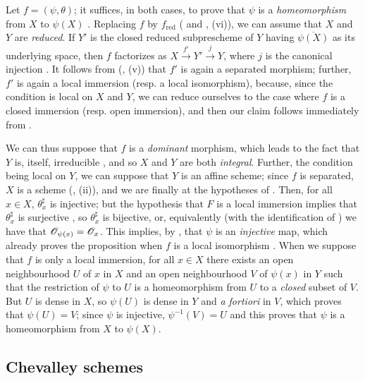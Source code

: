 Let $f=(\psi,\theta)$; it suffices, in both cases, to prove that $\psi$ is a
\emph{homeomorphism} from $X$ to $\psi(X)$ . Replacing $f$ by
$f_\mathrm{red}$ ( and , (vi)), we can assume that $X$
and $Y$ are \emph{reduced}. If $Y'$ is the closed reduced subprescheme of $Y$
having $\overline{\psi(X)}$ as its underlying space, then $f$ factorizes as
$X\xrightarrow{f'}Y'\xrightarrow{j}Y$, where $j$ is the canonical injection
. It follows from (, (v)) that $f'$ is again a
separated morphism; further, $f'$ is again
a local immersion (resp. a local isomorphism), because, since the condition is local on $X$
and $Y$, we can reduce ourselves to the case where $f$ is a closed immersion (resp. open
immersion), and then our claim follows immediately from .

We can thus suppose that $f$ is a \emph{dominant} morphism, which leads to the
fact that $Y$ is, itself, irreducible , and so $X$ and $Y$
are both \emph{integral}. Further, the condition being local on $Y$, we can
suppose that $Y$ is an affine scheme; since $f$ is separated, $X$ is a scheme
(, (ii)), and we are finally at the hypotheses of .
Then, for all $x\in X$, $\theta_x^\sharp$ is injective; but the hypothesis that $F$
is a local immersion implies that $\theta_x^\sharp$ is surjective , so
$\theta_x^\sharp$ is bijective, or, equivalently (with the identification of
) we have that $\mathscr{O}_{\psi(x)}=\mathscr{O}_x$. This implies, by ,
that $\psi$ is an \emph{injective} map, which already proves the proposition
when $f$ is a local isomorphism . When we suppose that $f$ is only
a local immersion, for all $x\in X$ there exists an open neighbourhood $U$ of
$x$ in $X$ and an open neighbourhood $V$ of $\psi(x)$ in $Y$ such that the
restriction of $\psi$ to $U$ is a homeomorphism from $U$ to a \emph{closed}
subset of $V$. But $U$ is dense in $X$, so $\psi(U)$ is dense in $Y$ and
\emph{a fortiori} in $V$, which proves that $\psi(U)=V$; since $\psi$ is
injective, $\psi^{-1}(V)=U$ and this proves that $\psi$ is a homeomorphism from
$X$ to $\psi(X)$.

\subsection{Chevalley schemes}
\label{1-schemes-8.3}

